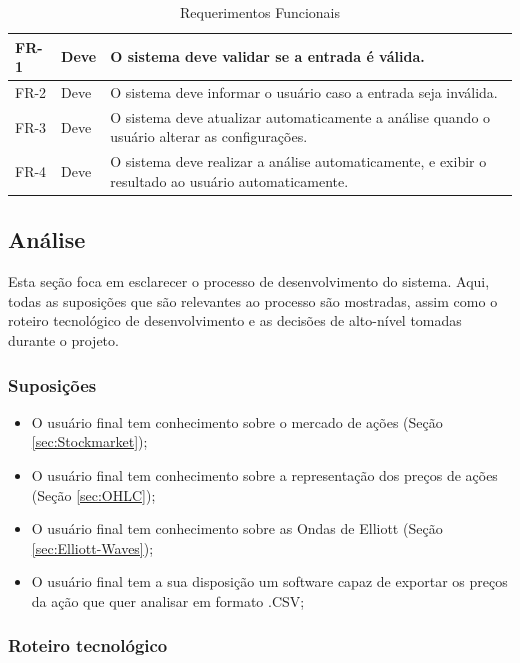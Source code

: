 \documentclass[12pt]{article}
\begin{document}
\begingroup
\renewcommand*{\arraystretch}{1.2}
\begin{table}[H]
	\caption{Requerimentos Funcionais}
	\label{tab:functional-requirements}
	\begin{tabular}{p{1cm} p{1cm} p{12cm}}
		FR-1 & Deve & O sistema deve validar se a entrada é válida.\\
		\midrule
		FR-2 & Deve & O sistema deve informar o usuário caso a entrada seja inválida.\\
		\midrule
		FR-3 & Deve & O sistema deve atualizar automaticamente a análise quando o usuário
					  alterar as configurações.\\
		\midrule
		FR-4 & Deve & O sistema deve realizar a análise automaticamente, e exibir o resultado
					  ao usuário automaticamente.\\
	\end{tabular}		
\end{table}
\endgroup

\subsection{Análise}

Esta seção foca em esclarecer o processo de desenvolvimento do sistema. Aqui, todas as
suposições que são relevantes ao processo são mostradas, assim como o roteiro tecnológico de
desenvolvimento e as decisões de alto-nível tomadas durante o projeto.

\subsubsection{Suposições}

\begin{itemize}
	\item O usuário final tem conhecimento sobre o mercado de ações (Seção \ref{sec:Stockmarket});
	\item O usuário final tem conhecimento sobre a representação dos preços de ações (Seção \ref{sec:OHLC});
	\item O usuário final tem conhecimento sobre as Ondas de Elliott (Seção \ref{sec:Elliott-Waves});
	\item O usuário final tem a sua disposição um software capaz de exportar os preços da
		  ação que quer analisar em formato .CSV;
\end{itemize}

\subsubsection{Roteiro tecnológico}
\end{document}

